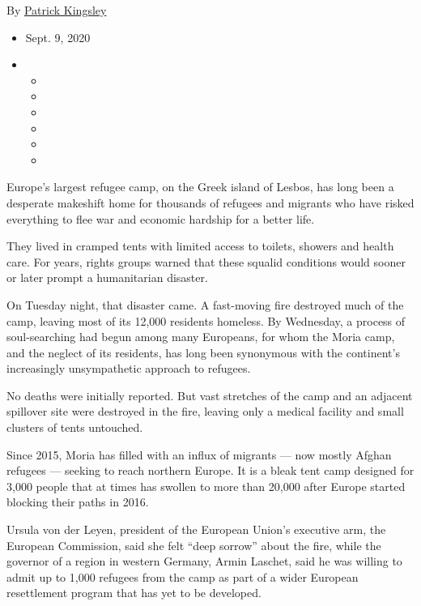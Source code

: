By \href{https://www.nytimes3xbfgragh.onion/by/patrick-kingsley}{Patrick
Kingsley}

\begin{itemize}
\item
  Sept. 9, 2020
\item
  \begin{itemize}
  \item
  \item
  \item
  \item
  \item
  \item
  \end{itemize}
\end{itemize}

Europe's largest refugee camp, on the Greek island of Lesbos, has long
been a desperate makeshift home for thousands of refugees and migrants
who have risked everything to flee war and economic hardship for a
better life.

They lived in cramped tents with limited access to toilets, showers and
health care. For years, rights groups warned that these squalid
conditions would sooner or later prompt a humanitarian disaster.

On Tuesday night, that disaster came. A fast-moving fire destroyed much
of the camp, leaving most of its 12,000 residents homeless. By
Wednesday, a process of soul-searching had begun among many Europeans,
for whom the Moria camp, and the neglect of its residents, has long been
synonymous with the continent's increasingly unsympathetic approach to
refugees.

No deaths were initially reported. But vast stretches of the camp and an
adjacent spillover site were destroyed in the fire, leaving only a
medical facility and small clusters of tents untouched.

Since 2015, Moria has filled with an influx of migrants --- now mostly
Afghan refugees --- seeking to reach northern Europe. It is a bleak tent
camp designed for 3,000 people that at times has swollen to more than
20,000 after Europe started blocking their paths in 2016.

Ursula von der Leyen, president of the European Union's executive arm,
the European Commission, said she felt ``deep sorrow'' about the fire,
while the governor of a region in western Germany, Armin Laschet, said
he was willing to admit up to 1,000 refugees from the camp as part of a
wider European resettlement program that has yet to be developed.

